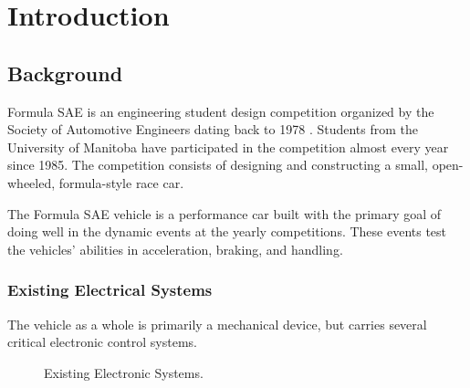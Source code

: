 %
%
%
%

\chapter{Introduction}

\section{Background}

Formula SAE is
an engineering student design competition organized by the Society
of Automotive Engineers dating back to 1978 \cite{fsaehistory}. Students
from the University of Manitoba have participated in the competition
almost every year since 1985. The competition consists of designing
and constructing a small, open-wheeled, formula-style race car.

The Formula SAE vehicle is a performance car built with the primary goal of doing well in the dynamic events at the yearly competitions. These events test the vehicles' abilities in acceleration, braking, and handling.

\subsection{Existing Electrical Systems}

The vehicle as a whole is primarily a mechanical device, but carries several critical electronic control systems.

\begin{figure}[h!]
  \begin{center}
    \caption{\label{fig:qm/complexfunctions} Existing Electronic Systems.}
  \end{center}
\end{figure}

